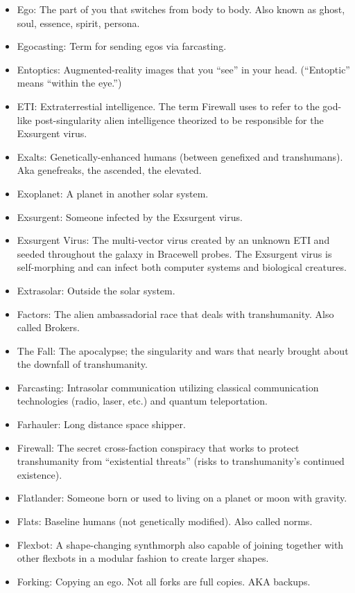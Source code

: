 \begin{itemize}
\item Ego: The part of you that switches from body to body. Also  known as ghost, soul, essence, spirit, persona.
\item Egocasting: Term for sending egos via farcasting.
\item Entoptics: Augmented-reality images that you ``see'' in your  head. (``Entoptic'' means ``within the eye.'')
\item ETI: Extraterrestial intelligence. The term Firewall uses to  refer to the god-like post-singularity alien intelligence theorized  to be responsible for the Exsurgent virus.
\item Exalts: Genetically-enhanced humans (between genefixed and  transhumans). Aka genefreaks, the ascended, the elevated.
\item Exoplanet: A planet in another solar system.
\item Exsurgent: Someone infected by the Exsurgent virus.
\item Exsurgent Virus: The multi-vector virus created by an unknown  ETI and seeded throughout the galaxy in Bracewell probes. The  Exsurgent virus is self-morphing and can infect both computer  systems and biological creatures.
\item Extrasolar: Outside the solar system.
\item Factors: The alien ambassadorial race that deals with  transhumanity. Also called Brokers.
\item The Fall: The apocalypse; the singularity and wars that nearly  brought about the downfall of transhumanity.
\item Farcasting: Intrasolar communication utilizing classical  communication technologies (radio, laser, etc.) and quantum  teleportation.
\item Farhauler: Long distance space shipper.
\item Firewall: The secret cross-faction conspiracy that works to  protect transhumanity from ``existential threats'' (risks to  transhumanity's continued existence).
\item Flatlander: Someone born or used to living on a planet or moon  with gravity.
\item Flats: Baseline humans (not genetically modified). Also called  norms.
\item Flexbot: A shape-changing synthmorph also capable of joining  together with other flexbots in a modular fashion to create larger  shapes.
\item Forking: Copying an ego. Not all forks are full copies. AKA  backups.

\end{itemize}
